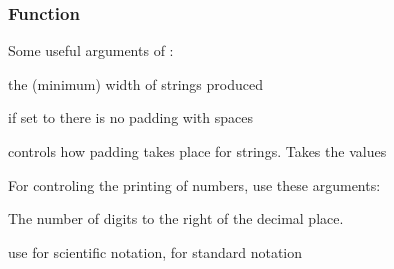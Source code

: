 \documentclass[12pt]{beamer}\usepackage[]{graphicx}\usepackage[]{color}
\begin{document}
\begin{frame}[fragile]
\frametitle{Function }

Some useful arguments of :
\bi
 \item {} the (minimum) width of strings produced
 \item {} if set to  there is no padding with spaces
 \item {} controls how padding takes place for strings. Takes the values 
\ei

For controling the printing of numbers, use these arguments:
\bi
 \item {} The number of digits to the right of the decimal place.
 \item {} use  for scientific notation,  for standard notation
\ei

\end{frame}

\end{document}
